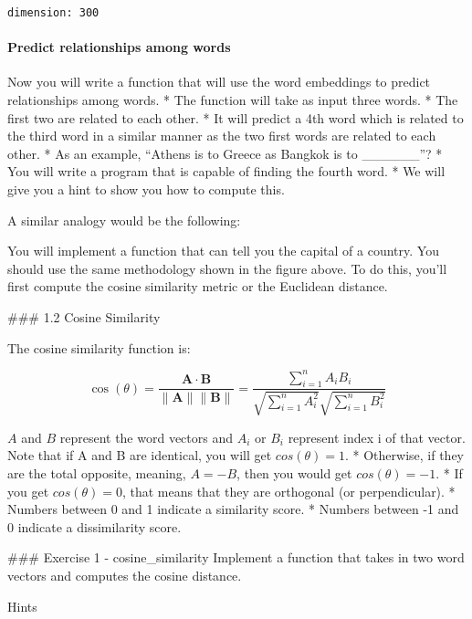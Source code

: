 \documentclass[11pt]{article}
\begin{document}
    \begin{Verbatim}[commandchars=\\\{\}]
dimension: 300
    \end{Verbatim}

    \hypertarget{predict-relationships-among-words}{%
\paragraph{Predict relationships among
words}\label{predict-relationships-among-words}}

Now you will write a function that will use the word embeddings to
predict relationships among words. * The function will take as input
three words. * The first two are related to each other. * It will
predict a 4th word which is related to the third word in a similar
manner as the two first words are related to each other. * As an
example, ``Athens is to Greece as Bangkok is to \_\_\_\_\_\_''? * You
will write a program that is capable of finding the fourth word. * We
will give you a hint to show you how to compute this.

A similar analogy would be the following:

You will implement a function that can tell you the capital of a
country. You should use the same methodology shown in the figure above.
To do this, you'll first compute the cosine similarity metric or the
Euclidean distance.

    \#\#\# 1.2 Cosine Similarity

The cosine similarity function is:

\[\cos (\theta)=\frac{\mathbf{A} \cdot \mathbf{B}}{\|\mathbf{A}\|\|\mathbf{B}\|}=\frac{\sum_{i=1}^{n} A_{i} B_{i}}{\sqrt{\sum_{i=1}^{n} A_{i}^{2}} \sqrt{\sum_{i=1}^{n} B_{i}^{2}}}\tag{1}\]

\(A\) and \(B\) represent the word vectors and \(A_i\) or \(B_i\)
represent index i of that vector. Note that if A and B are identical,
you will get \(cos(\theta) = 1\). * Otherwise, if they are the total
opposite, meaning, \(A= -B\), then you would get \(cos(\theta) = -1\). *
If you get \(cos(\theta) =0\), that means that they are orthogonal (or
perpendicular). * Numbers between 0 and 1 indicate a similarity score. *
Numbers between -1 and 0 indicate a dissimilarity score.

\#\#\# Exercise 1 - cosine\_similarity Implement a function that takes
in two word vectors and computes the cosine distance.

    Hints
\end{document}
